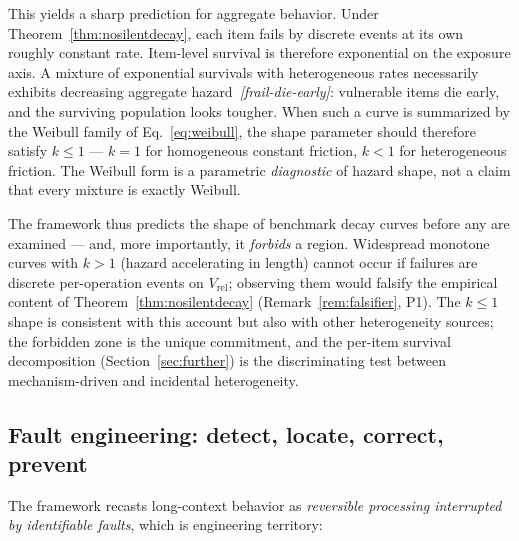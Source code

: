 \documentclass[11pt]{article}
\theoremstyle{remark}
\newif\ifslugs \slugstrue  %
\newcommand{\slug}[1]{\ifslugs\,{\small\textit{[#1]}}\fi}
\newcommand{\Vrel}{V_{\mathrm{rel}}}
\begin{document}
This yields a sharp prediction for aggregate behavior. Under Theorem~\ref{thm:nosilentdecay}, each item fails by
discrete events at its own roughly constant rate. Item-level survival is
therefore exponential on the exposure axis. A mixture of exponential survivals
with heterogeneous rates necessarily exhibits decreasing aggregate hazard
\citep{proschan1963}\slug{frail-die-early}: vulnerable items die early, and the surviving population
looks tougher. When such a curve is summarized by the Weibull family of
Eq.~\eqref{eq:weibull}, the shape parameter should therefore satisfy
$k \le 1$ --- $k = 1$ for homogeneous constant friction, $k < 1$ for
heterogeneous friction. The Weibull form is a parametric \emph{diagnostic} of
hazard shape, not a claim that every mixture is exactly Weibull.

The framework thus predicts the shape of benchmark decay curves before any are
examined --- and, more importantly, it \emph{forbids} a region. Widespread
monotone curves with $k > 1$ (hazard accelerating in length) cannot occur if
failures are discrete per-operation events on $\Vrel$; observing them would
falsify the empirical content of Theorem~\ref{thm:nosilentdecay}
(Remark~\ref{rem:falsifier}, P1). The $k \le 1$ shape is consistent with this account but also with
other heterogeneity sources; the forbidden zone is the unique commitment, and
the per-item survival decomposition (Section~\ref{sec:further}) is the
discriminating test between mechanism-driven and incidental heterogeneity.

\subsection{Fault engineering: detect, locate, correct, prevent}
\label{sec:engineering}

The framework recasts long-context behavior as \emph{reversible processing interrupted
by identifiable faults}, which is engineering territory:
\end{document}
